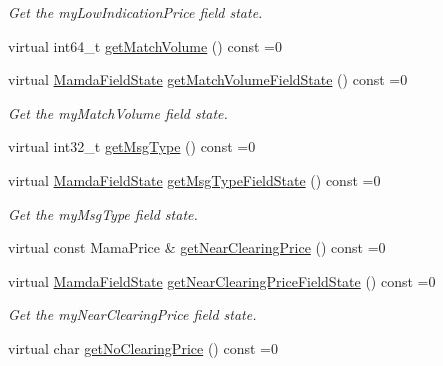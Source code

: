 \begin{CompactItemize}
\begin{CompactList}\small\item\em Get the my\-Low\-Indication\-Price field state. \item\end{CompactList}\item 
virtual int64\_\-t \hyperlink{classWombat_1_1MamdaOrderImbalanceUpdate_c50318820325fed581abb910afc646ae}{get\-Match\-Volume} () const =0
\item 
virtual \hyperlink{namespaceWombat_93aac974f2ab713554fd12a1fa3b7d2a}{Mamda\-Field\-State} \hyperlink{classWombat_1_1MamdaOrderImbalanceUpdate_656bd7d9029dafa1b306f2d1314daabe}{get\-Match\-Volume\-Field\-State} () const =0
\begin{CompactList}\small\item\em Get the my\-Match\-Volume field state. \item\end{CompactList}\item 
virtual int32\_\-t \hyperlink{classWombat_1_1MamdaOrderImbalanceUpdate_e98942bd6896e4596932dd61bdeb074d}{get\-Msg\-Type} () const =0
\item 
virtual \hyperlink{namespaceWombat_93aac974f2ab713554fd12a1fa3b7d2a}{Mamda\-Field\-State} \hyperlink{classWombat_1_1MamdaOrderImbalanceUpdate_389c47fd797b8c7648ef8abf9c6fb518}{get\-Msg\-Type\-Field\-State} () const =0
\begin{CompactList}\small\item\em Get the my\-Msg\-Type field state. \item\end{CompactList}\item 
virtual const Mama\-Price \& \hyperlink{classWombat_1_1MamdaOrderImbalanceUpdate_f898c7cf3351360df08d12992374df0c}{get\-Near\-Clearing\-Price} () const =0
\item 
virtual \hyperlink{namespaceWombat_93aac974f2ab713554fd12a1fa3b7d2a}{Mamda\-Field\-State} \hyperlink{classWombat_1_1MamdaOrderImbalanceUpdate_7e9327e36a0261dc4ec1e8fad116f994}{get\-Near\-Clearing\-Price\-Field\-State} () const =0
\begin{CompactList}\small\item\em Get the my\-Near\-Clearing\-Price field state. \item\end{CompactList}\item 
virtual char \hyperlink{classWombat_1_1MamdaOrderImbalanceUpdate_64c6b3c0341f7e20ced1c35897789b3d}{get\-No\-Clearing\-Price} () const =0
\item 

\end{CompactItemize}

